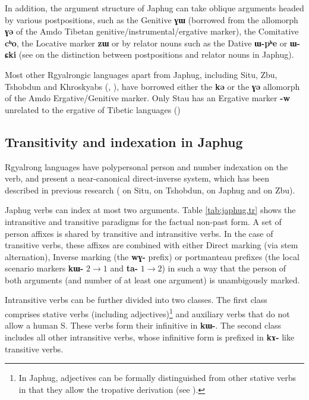 \documentclass[oneside,a4paper,11pt]{article}
\newcommand{\ipa}[1]{{\phon\textbf{\mbox{#1}}}} %
\begin{document}
In addition, the argument structure of Japhug can take oblique arguments headed by various postpositions, such as the Genitive \ipa{ɣɯ} (borrowed from the allomorph \ipa{ɣə} of the Amdo Tibetan genitive/instrumental/ergative marker), the Comitative \ipa{cʰo}, the Locative marker \ipa{zɯ} or by relator nouns such as the Dative  \ipa{ɯ-pʰe} or \ipa{ɯ-ɕki} (see \citealt[272-274]{jacques14linking} on the distinction between postpositions and relator nouns in Japhug).

Most other Rgyalrongic languages apart from Japhug, including Situ, Zbu, Tshobdun and Khroskyabs (\citealt{jackson98morphology}, \citealt{lai13affixale}), have borrowed either the \ipa{kə} or the \ipa{ɣə} allomorph of the Amdo  Ergative/Genitive marker. Only Stau has an Ergative marker \ipa{-w} unrelated to the ergative of Tibetic languages (\citealt{jacques14rtau})

\subsection{Transitivity and indexation in Japhug}
Rgyalrong languages have polypersonal person and number indexation on the verb, and present a near-canonical direct-inverse system, which has been described in previous research (\citealt{delancey81direction} on Situ,  \citealt{jackson02rentongdengdi} on Tshobdun,  \citealt{jacques10inverse} on Japhug and \citealt{gongxun14agreement} on Zbu). 

Japhug verbs can index at most two arguments. Table \ref{tab:japhug.tr} shows the intransitive and transitive paradigms for the factual non-past form. A set of person affixes is shared by transitive and intransitive verbs. In the case of transitive verbs, these affixes are combined with either Direct marking (via stem alternation), Inverse marking (the \ipa{wɣ-} prefix) or portmanteau prefixes (the local scenario markers \ipa{kɯ-} $2\rightarrow1$ and \ipa{ta-} $1\rightarrow2$) in such a way that the person of both arguments (and number of at least one argument) is unambigously marked.

Intransitive verbs can be further divided into two classes. The first class comprises stative verbs (including adjectives)\footnote{In Japhug, adjectives can be formally distinguished from other stative verbs in that they allow the tropative derivation (see \citealt{jacques13tropative}).} and auxiliary verbs that do not allow a human S. These verbs form their infinitive in \ipa{kɯ-}. The second class includes all other intransitive verbs, whose infinitive form is prefixed in \ipa{kɤ-} like transitive verbs.
\end{document}
